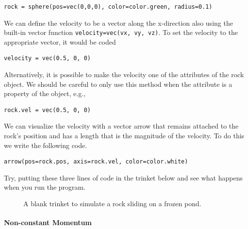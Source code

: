 \begin{verbatim}
rock = sphere(pos=vec(0,0,0), color=color.green, radius=0.1)
\end{verbatim}

We can define the velocity to be a vector along the x-direction also using the built-in vector function \texttt{velocity=vec(vx, vy, vz)}. To set the velocity to the appropriate vector, it would be coded

\begin{verbatim}
velocity = vec(0.5, 0, 0)
\end{verbatim}

Alternatively, it is possible to make the velocity one of the attributes of the rock object. We should be careful to only use this method when the attribute is a property of the object, e.g.,

\begin{verbatim}
rock.vel = vec(0.5, 0, 0)
\end{verbatim}

We can visualize the velocity with a vector arrow that remains attached to the rock's position and has a length that is the magnitude of the velocity. To do this we write the following code.

\begin{verbatim}
arrow(pos=rock.pos, axis=rock.vel, color=color.white)
\end{verbatim}

Try, putting these three lines of code in the trinket below and see what happens when you run the program.

\begin{figure}[!htbp]
\centering
\caption[]{A blank trinket to simulate a rock sliding on a frozen pond.}
\label{chap:momentumandcm:blanktrinket}
\end{figure}

\paragraph{Non-constant Momentum}

